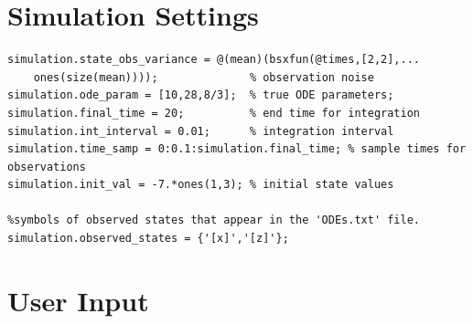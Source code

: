 \section{Simulation Settings}

\color{RoyalPurple}\begin{verbatim}
simulation.state_obs_variance = @(mean)(bsxfun(@times,[2,2],...
    ones(size(mean))));              % observation noise
simulation.ode_param = [10,28,8/3];  % true ODE parameters;
simulation.final_time = 20;          % end time for integration
simulation.int_interval = 0.01;      % integration interval
simulation.time_samp = 0:0.1:simulation.final_time; % sample times for observations
simulation.init_val = -7.*ones(1,3); % initial state values

%symbols of observed states that appear in the 'ODEs.txt' file.
simulation.observed_states = {'[x]','[z]'};
\end{verbatim}
\color{black}


\section{User Input}

